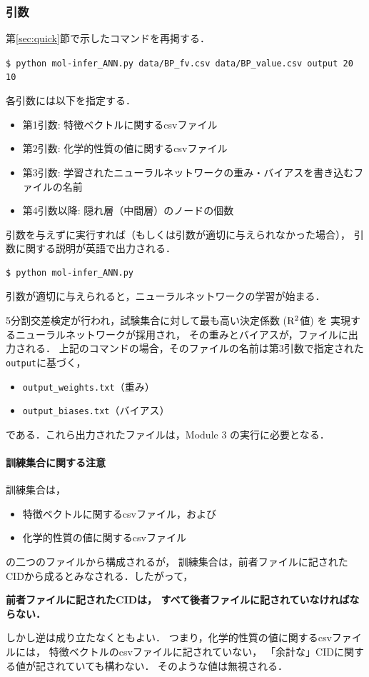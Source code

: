 \documentclass[11pt,dvipdfmx,twoside]{jarticle}
\newcommand{\secref}[1]{第\ref{sec:#1}節}
\begin{document}
\subsubsection{引数}
\secref{quick}で示したコマンドを再掲する．
\begin{oframed}
{\small
\verb|$ python mol-infer_ANN.py data/BP_fv.csv data/BP_value.csv output 20 10|
}
\end{oframed}
各引数には以下を指定する．
\begin{itemize}
\item 第1引数: 特徴ベクトルに関するcsvファイル
\item 第2引数: 化学的性質の値に関するcsvファイル
\item 第3引数: 学習されたニューラルネットワークの重み・バイアスを書き込むファイルの名前
\item 第4引数以降: 隠れ層（中間層）のノードの個数
\end{itemize}

引数を与えずに実行すれば（もしくは引数が適切に与えられなかった場合），
引数に関する説明が英語で出力される．
\begin{oframed}
  {\small
\begin{verbatim}
$ python mol-infer_ANN.py 
\end{verbatim}
  }
  \end{oframed}


引数が適切に与えられると，ニューラルネットワークの学習が始まる．

5分割交差検定が行われ，試験集合に対して最も高い決定係数 (${\rm R}^2$値) を
実現するニューラルネットワークが採用され，
その重みとバイアスが，ファイルに出力される．
上記のコマンドの場合，そのファイルの名前は第3引数で指定された\verb|output|に基づく，
\begin{itemize}
\item \verb|output_weights.txt|（重み）
\item \verb|output_biases.txt|（バイアス）
\end{itemize}
である．これら出力されたファイルは，Module 3 の実行に必要となる．


\paragraph{訓練集合に関する注意}
訓練集合は，
\begin{itemize}
\item 特徴ベクトルに関するcsvファイル，および
\item 化学的性質の値に関するcsvファイル
\end{itemize}
の二つのファイルから構成されるが，
訓練集合は，前者ファイルに記されたCIDから成るとみなされる．したがって，
\begin{center}
  {\bf 前者ファイルに記されたCIDは，
  すべて後者ファイルに記されていなければならない．}
\end{center}
しかし逆は成り立たなくともよい．
つまり，化学的性質の値に関するcsvファイルには，
特徴ベクトルのcsvファイルに記されていない，
「余計な」CIDに関する値が記されていても構わない．
そのような値は無視される．
\end{document}
